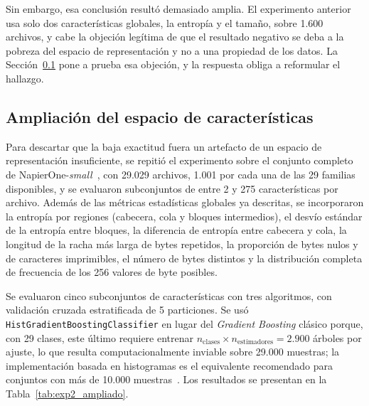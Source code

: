 Sin embargo, esa conclusión resultó demasiado amplia. El experimento anterior usa solo dos características globales, la entropía y el tamaño, sobre 1.600 archivos, y cabe la objeción legítima de que el resultado negativo se deba a la pobreza del espacio de representación y no a una propiedad de los datos. La Sección~\ref{subsec:exp2_ampliacion} pone a prueba esa objeción, y la respuesta obliga a reformular el hallazgo.

\subsection{Ampliación del espacio de características}
\label{subsec:exp2_ampliacion}

Para descartar que la baja exactitud fuera un artefacto de un espacio de representación insuficiente, se repitió el experimento sobre el conjunto completo de NapierOne-\textit{small}~\cite{paper_7_napierone}, con 29.029 archivos, 1.001 por cada una de las 29 familias disponibles, y se evaluaron subconjuntos de entre 2 y 275 características por archivo. Además de las métricas estadísticas globales ya descritas, se incorporaron la entropía por regiones (cabecera, cola y bloques intermedios), el desvío estándar de la entropía entre bloques, la diferencia de entropía entre cabecera y cola, la longitud de la racha más larga de bytes repetidos, la proporción de bytes nulos y de caracteres imprimibles, el número de bytes distintos y la distribución completa de frecuencia de los 256 valores de byte posibles.

Se evaluaron cinco subconjuntos de características con tres algoritmos, con validación cruzada estratificada de 5 particiones. Se usó \texttt{HistGradientBoostingClassifier} en lugar del \textit{Gradient Boosting} clásico porque, con 29 clases, este último requiere entrenar $n_{\text{clases}} \times n_{\text{estimadores}} = 2.900$ árboles por ajuste, lo que resulta computacionalmente inviable sobre 29.000 muestras; la implementación basada en histogramas es el equivalente recomendado para conjuntos con más de 10.000 muestras~\cite{sklearn}. Los resultados se presentan en la Tabla~\ref{tab:exp2_ampliado}.

